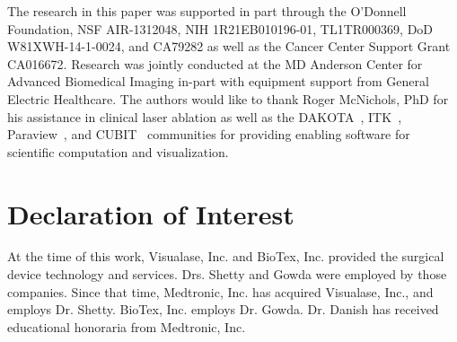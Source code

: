 \documentclass[12pt]{article}
\begin{document}
The research in this paper was supported in part through the O'Donnell Foundation,
NSF AIR-1312048, NIH 1R21EB010196-01, TL1TR000369, DoD W81XWH-14-1-0024,
 and CA79282 as well as the Cancer Center Support
Grant CA016672.
Research was jointly conducted at the MD Anderson Center for Advanced
Biomedical Imaging in-part with equipment support from General Electric
Healthcare.
The authors would like to thank Roger McNichols, PhD 
for his assistance in clinical laser ablation as well as the
DAKOTA~\cite{eldred2007dakota},
ITK~\cite{ITKSoftwareGuideSecondEdition}, 
Paraview~\cite{Paraview}, and
CUBIT~\cite{cubit} communities for providing enabling software for
scientific computation and visualization.  



\section*{Declaration of Interest}

At the time of this work, Visualase, Inc. and BioTex, Inc. provided
the surgical device technology and services. Drs. Shetty and Gowda
were employed by those companies. Since that time, Medtronic, Inc.
has acquired Visualase, Inc., and employs Dr. Shetty. BioTex, Inc.
employs Dr. Gowda. Dr. Danish has received educational honoraria
from Medtronic, Inc.



%
\clearpage



\end{document}
